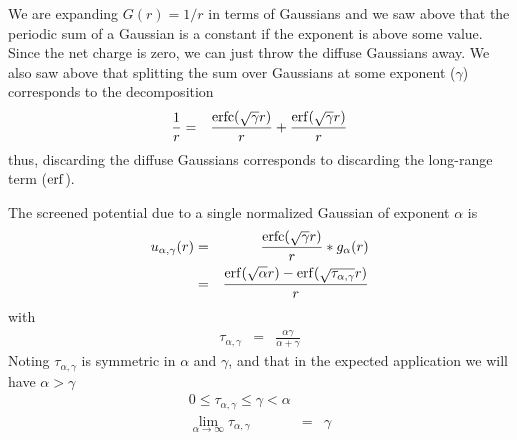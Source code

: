 \documentclass[12pt]{article}
\DeclareMathOperator{\erfc}{erfc}
\begin{document}
We are expanding $G(r) = 1/r$ in terms of Gaussians and we saw above that the periodic sum of a Gaussian is a constant if the exponent is above some value.  Since the net charge is zero, we can just throw the diffuse Gaussians away.  We also saw above that splitting the sum over Gaussians at some exponent ($\gamma$) corresponds to the decomposition
\begin{eqnarray}
  \frac{1}{r} & = & \frac{\erfc(\sqrt{\gamma} r)}{r} + \frac{\erf(\sqrt{\gamma} r)}{r} 
\end{eqnarray}
thus, discarding the diffuse Gaussians corresponds to discarding the long-range term ($\erf$).

The screened potential due to a single normalized Gaussian of exponent $\alpha$ is 
\begin{eqnarray}
  u_{\alpha,\gamma}(r) & = & \frac{\erfc(\sqrt{\gamma} r)}{r}  * g_\alpha(r) \\
   & = & \frac{\erf(\sqrt{\alpha}r) - \erf(\sqrt{\tau_{\alpha,\gamma}}r)}{r}
\end{eqnarray}
with 
\begin{eqnarray}
  \tau_{\alpha,\gamma} & = & \frac{\alpha \gamma}{\alpha + \gamma}
\end{eqnarray}
Noting $\tau_{\alpha,\gamma}$ is symmetric in $\alpha$ and $\gamma$, and that in the expected application we will have $\alpha > \gamma$
\begin{eqnarray}
  0 \le \tau_{\alpha,\gamma} \le \gamma < \alpha \\
  \lim_{\alpha \rightarrow \infty} \tau_{\alpha,\gamma} & = & \gamma
\end{eqnarray}
\end{document}

